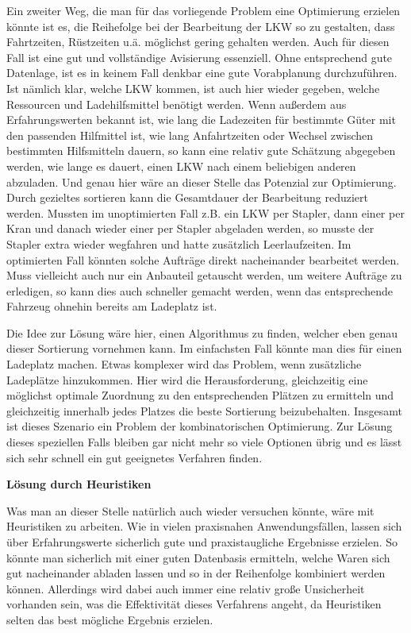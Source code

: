 Ein zweiter Weg, die man für das vorliegende Problem eine Optimierung erzielen könnte ist es, die Reihefolge bei der Bearbeitung der LKW so zu gestalten, dass Fahrtzeiten, Rüstzeiten u.ä. möglichst gering gehalten werden. Auch für diesen Fall ist eine gut und vollständige Avisierung essenziell. Ohne entsprechend gute Datenlage, ist es in keinem Fall denkbar eine gute Vorabplanung durchzuführen. Ist nämlich klar, welche LKW kommen, ist auch hier wieder gegeben, welche Ressourcen und Ladehilfsmittel benötigt werden. Wenn außerdem aus Erfahrungswerten bekannt ist, wie lang die Ladezeiten für bestimmte Güter mit den passenden Hilfmittel ist, wie lang Anfahrtzeiten oder Wechsel zwischen bestimmten Hilfsmitteln dauern, so kann eine relativ gute Schätzung abgegeben werden, wie lange es dauert, einen LKW nach einem beliebigen anderen abzuladen. Und genau hier wäre an dieser Stelle das Potenzial zur Optimierung. Durch gezieltes sortieren kann die Gesamtdauer der Bearbeitung reduziert werden. Mussten im unoptimierten Fall z.B. ein LKW per Stapler, dann einer per Kran und danach wieder einer per Stapler abgeladen werden, so musste der Stapler extra wieder wegfahren und hatte zusätzlich Leerlaufzeiten. Im optimierten Fall könnten solche Aufträge direkt nacheinander bearbeitet werden. Muss vielleicht auch nur ein Anbauteil getauscht werden, um weitere Aufträge zu erledigen, so kann dies auch schneller gemacht werden, wenn das entsprechende Fahrzeug ohnehin bereits am Ladeplatz ist.

Die Idee zur Lösung wäre hier, einen Algorithmus zu finden, welcher eben genau dieser Sortierung vornehmen kann. Im einfachsten Fall könnte man dies für einen Ladeplatz machen. Etwas komplexer wird das Problem, wenn zusätzliche Ladeplätze hinzukommen. Hier wird die Herausforderung, gleichzeitig eine möglichst optimale Zuordnung zu den entsprechenden Plätzen zu ermitteln und gleichzeitig innerhalb jedes Platzes die beste Sortierung beizubehalten. Insgesamt ist dieses Szenario ein Problem der kombinatorischen Optimierung. Zur Lösung dieses speziellen Falls bleiben gar nicht mehr so viele Optionen übrig und es lässt sich sehr schnell ein gut geeignetes Verfahren finden.

\textbf{Lösung durch Heuristiken}

Was man an dieser Stelle natürlich auch wieder versuchen könnte, wäre mit Heuristiken zu arbeiten. Wie in vielen praxisnahen Anwendungsfällen, lassen sich über Erfahrungswerte sicherlich gute und praxistaugliche Ergebnisse erzielen. So könnte man sicherlich mit einer guten Datenbasis ermitteln, welche Waren sich gut nacheinander abladen lassen und so in der Reihenfolge kombiniert werden können. Allerdings wird dabei auch immer eine relativ große Unsicherheit vorhanden sein, was die Effektivität dieses Verfahrens angeht, da Heuristiken selten das best mögliche Ergebnis erzielen.


